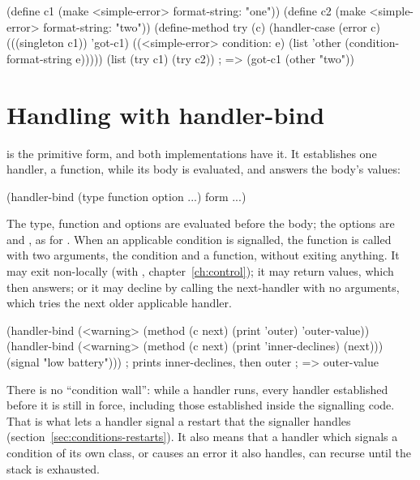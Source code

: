 \begin{dylan}
(define c1 (make <simple-error> format-string: "one"))
(define c2 (make <simple-error> format-string: "two"))
(define-method try (c)
  (handler-case (error c)
    (((singleton c1)) 'got-c1)
    ((<simple-error> condition: e) (list 'other (condition-format-string e)))))
(list (try c1) (try c2))     ; => (got-c1 (other "two"))
\end{dylan}

\section{Handling with handler-bind}\label{sec:conditions-handler-bind}

 is the primitive form, and both implementations
have it. It establishes one handler, a function, while its body is
evaluated, and answers the body's values:

\begin{dylan}
(handler-bind (type function option ...)
  form ...)
\end{dylan}

\noindent The type, function and options are evaluated before the body;
the options are  and , as for
. When an applicable condition is signalled, the
function is called with two arguments, the condition and a
 function, without exiting anything. It may exit
non-locally (with , chapter~\ref{ch:control}); it may
return values, which  then answers; or it may decline by
calling the next-handler with no arguments, which tries the next older
applicable handler.

\begin{dylan}
(handler-bind (<warning> (method (c next) (print 'outer) 'outer-value))
  (handler-bind (<warning> (method (c next) (print 'inner-declines) (next)))
    (signal "low battery")))
; prints inner-declines, then outer
; => outer-value
\end{dylan}

\noindent There is no ``condition wall'': while a handler runs, every
handler established before it is still in force, including those
established inside the signalling code. That is what lets a handler
signal a restart that the signaller handles
(section~\ref{sec:conditions-restarts}). It also means that a handler
which signals a condition of its own class, or causes an error it also
handles, can recurse until the stack is exhausted.

